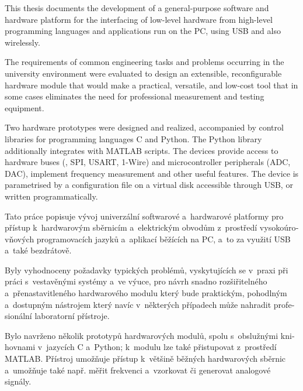 
\begin{abstract-english}
This thesis documents the development of a general-purpose software and hardware platform for the interfacing of low-level hardware from high-level programming languages and applications run on the PC, using USB and also wirelessly.

The requirements of common engineering tasks and problems occurring in the university environment were evaluated to design an extensible, reconfigurable hardware module that would make a practical, versatile, and low-cost tool that in some cases eliminates the need for professional measurement and testing equipment.

Two hardware prototypes were designed and realized, accompanied by control libraries for programming languages C and Python. The Python library additionally integrates with MATLAB scripts. The devices provide access to hardware buses (\IIC, SPI, USART, 1-Wire) and microcontroller peripherals (ADC, DAC), implement frequency measurement and other useful features. The device is parametrised by a configuration file on a virtual disk accessible through USB, or written programmatically.
\end{abstract-english}

\begin{abstract-czech}
\begin{otherlanguage}{czech}
Tato práce popisuje vývoj univerzální softwarové a~hardwarové platformy pro přístup k~hardwarovým sběrnicím a~elektrickým obvodům z~prostředí vysokoúrovňových programovacích jazyků a~aplikací běžících na PC, a~to za využití USB a~také bezdrátově.

Byly vyhodnoceny požadavky typických problémů, vyskytujících se v~praxi při práci s~vestavěnými systémy a~ve výuce, pro návrh snadno rozšiřitelného a~přenastavitleného hardwarového modulu který bude praktickým, pohodlným a~dostupným nástrojem který navíc v~některých případech může nahradit profesionální laboratorní přístroje.

Bylo navrženo několik prototypů hardwarových modulů, spolu s~obslužnými knihovnami v~jazycích C a~Python; k~modulu lze také přistupovat z~prostředí MATLAB. Přístroj umožňuje přístup k~většině běžných hardwarových sběrnic a~umožňuje také např. měřit frekvenci a~vzorkovat či generovat analogové signály.
\end{otherlanguage}
\end{abstract-czech}
